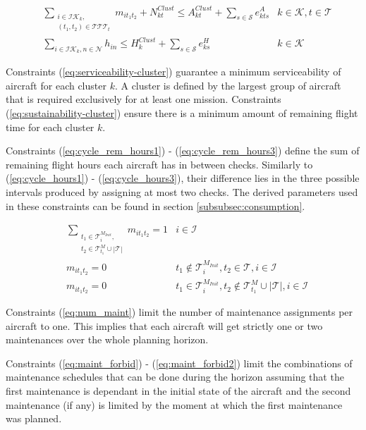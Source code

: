 \documentclass[a4paper,onecolumn,fleqn]{article}
\begin{document}
    \begin{align}
       & \sum_{\substack{i \in \mathcal{IK}_k, \\ (t_1, t_2) \in \mathcal{T}\mathcal{T}\mathcal{T}_{t}}} m_{it_1t_2} + N^{Clust}_{kt} \leq A^{Clust}_{kt} + \sum_{s \in \mathcal{S}} e^{A}_{kts}
        &k \in \mathcal{K}, t \in \mathcal{T} \label{eq:serviceability-cluster}\\
       & \sum_{i \in \mathcal{IK}_k, n \in \mathcal{N}} h_{in} \leq H^{Clust}_{k} + \sum_{s \in \mathcal{S}} e^{H}_{ks}
        &k \in \mathcal{K} \label{eq:sustainability-cluster}
    \end{align}

    Constraints (\ref{eq:serviceability-cluster}) guarantee a minimum serviceability of aircraft for each cluster $k$. A cluster is defined by the largest group of aircraft that is required exclusively for at least one mission. 
    Constraints (\ref{eq:sustainability-cluster}) ensure there is a minimum amount of remaining flight time for each cluster $k$.

    Constraints (\ref{eq:cycle_rem_hours1}) - (\ref{eq:cycle_rem_hours3}) define the sum of remaining flight hours each aircraft has in between checks. Similarly to (\ref{eq:cycle_hours1}) - (\ref{eq:cycle_hours3}), their difference lies in the three possible intervals produced by assigning at most two checks. The derived parameters used in these constraints can be found in section \ref{subsubsec:consumption}.

    \begin{align}
        & \sum_{\substack{t_1 \in \mathcal{T}^{M_{Init}}_i, \\ t_2 \in \mathcal{T}^M_{t_1} \cup |\mathcal{T}|}} m_{it_1t_2} =  1 
          & i \in \mathcal{I}\label{eq:num_maint} \\
        & m_{it_1t_2} =  0
          & t_1 \notin \mathcal{T}^{M_{Init}}_i, t_2 \in \mathcal{T}, i \in \mathcal{I} \label{eq:maint_forbid} \\
        & m_{it_1t_2} =  0
          & t_1 \in \mathcal{T}^{M_{Init}}_i, t_2 \notin \mathcal{T}^M_{t_1} \cup |\mathcal{T}|, i \in \mathcal{I} \label{eq:maint_forbid2}
    \end{align}

    Constraints (\ref{eq:num_maint}) limit the number of maintenance assignments per aircraft to one. This implies that each aircraft will get strictly one or two maintenances over the whole planning horizon.

    Constraints (\ref{eq:maint_forbid}) - (\ref{eq:maint_forbid2}) limit the combinations of maintenance schedules that can be done during the horizon assuming that the first maintenance is dependant in the initial state of the aircraft and the second maintenance (if any) is limited by the moment at which the first maintenance was planned.
\end{document}
